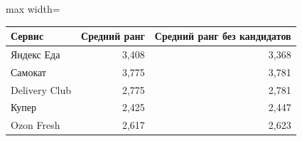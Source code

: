 {%
\small
\setlength{\tabcolsep}{3.0pt}
\renewcommand{\arraystretch}{1.12}
\begin{adjustbox}{max width=\textwidth}
\begin{tabular}{lrr}
\toprule
Сервис & Средний ранг & Средний ранг без кандидатов \\
\midrule
Яндекс Еда & 3,408 & 3,368 \\
Самокат & 3,775 & 3,781 \\
Delivery Club & 2,775 & 2,781 \\
Купер & 2,425 & 2,447 \\
Ozon Fresh & 2,617 & 2,623 \\
\bottomrule
\end{tabular}
\end{adjustbox}
}